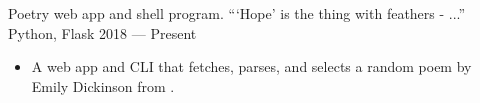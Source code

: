 \showoff
{}
{Poetry web app and shell program. ```Hope' is the thing with feathers - ...''}
{Python, Flask}
{2018 --- Present}

\begin{itemize}[label=$\triangleright$]
    \item A web app and CLI that fetches, parses, and selects a random poem by Emily Dickinson from .
\end{itemize}
